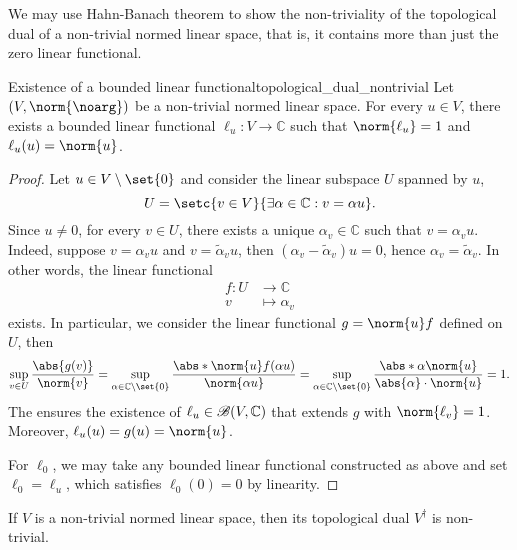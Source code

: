 We may use Hahn-Banach theorem to show the non-triviality of the topological dual of a non-trivial normed linear space, that is, it contains more than just the zero linear functional.
\begin{lemma}{Existence of a bounded linear functional}{topological_dual_nontrivial}
    Let \((V, \norm{\noarg})\) be a non-trivial normed linear space. For every \(u \in V\), there exists a bounded linear functional \(\ell_{u} : V \to \mathbb{C}\) such that \(\norm{\ell_u} = 1\) and \(\ell_u(u) = \norm{u}\).
\end{lemma}
\begin{proof}
    Let \(u \in V \setminus \set{0}\) and consider the linear subspace \(U\) spanned by \(u\),
    \begin{equation*}
        U = \setc{v \in V}{\exists \alpha \in \mathbb{C}: v = \alpha u}.
    \end{equation*}
    Since \(u \neq 0\), for every \(v \in U\), there exists a unique \(\alpha_v \in \mathbb{C}\) such that \(v = \alpha_v u\).
    Indeed, suppose \(v = \alpha_v u\) and \(v = \tilde{\alpha}_v u\), then \((\alpha_v - \tilde{\alpha}_v)u = 0\), hence \(\alpha_v = \tilde{\alpha}_v\). In other words, the linear functional
    \begin{align*}
        f : U &\to \mathbb{C}\\
            v &\mapsto \alpha_v
    \end{align*}
    exists. In particular, we consider the linear functional \(g = \norm{u} f\) defined on \(U\), then
    \begin{equation*}
        \sup_{v \in U} \frac{\abs{g(v)}}{\norm{v}} = \sup_{\alpha \in \mathbb{C}\setminus\set{0}} \frac{\abs*{\norm{u} f(\alpha u)}}{\norm{\alpha u}} = \sup_{\alpha \in \mathbb{C}\setminus\set{0}} \frac{\abs*{\alpha\norm{u}}}{\abs{\alpha}\cdot \norm{u}} = 1.
    \end{equation*}
    The  ensures the existence of \(\ell_u \in \mathscr{B}(V, \mathbb{C})\) that extends \(g\) with \(\norm{\ell_v} = 1\). Moreover, \(\ell_u(u) = g(u) = \norm{u}\).

    For \(\ell_0\), we may take any bounded linear functional constructed as above and set \(\ell_0 = \ell_u\), which satisfies \(\ell_0(0) = 0\) by linearity.
\end{proof}
\begin{corollary}
    If \(V\) is a non-trivial normed linear space, then its topological dual \(V^\dag\) is non-trivial.
\end{corollary}
